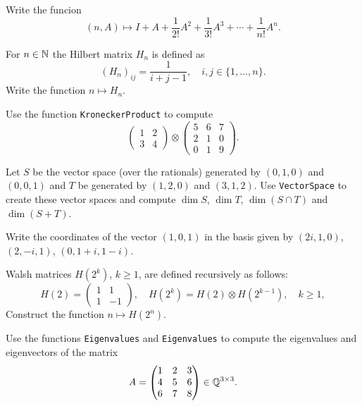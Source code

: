 \begin{prob}
    Write the funcion
    \[
    (n,A)\mapsto I+A+\frac{1}{2!}A^2+\frac{1}{3!}A^3+\cdots+\frac{1}{n!}A^{n}.
    \]
\end{prob}

\begin{prob}
  For $n\in\mathbb{N}$ the Hilbert matrix $H_n$ is defined as 
  \[
    (H_n)_{ij}=\frac{1}{i+j-1},\quad i,j\in\{1,\dots,n\}.
  \]
  Write the function $n\mapsto H_n$.
\end{prob}

\begin{prob}
  Use the function \lstinline{KroneckerProduct} to 
  compute
  \[
    \begin{pmatrix}
      1 & 2\\
      3 & 4
    \end{pmatrix}
    \otimes
    \begin{pmatrix}
      5 & 6 & 7\\
      2 & 1 & 0\\
      0 & 1 & 9
    \end{pmatrix}.
  \]
\end{prob}


\begin{prob}
	\label{prob:vsQ}
	Let $S$ be the vector space (over the rationals) generated by $(0,1,0)$ and
	$(0,0,1)$ and $T$ be generated by $(1,2,0)$ and $(3,1,2)$. Use
	\lstinline{VectorSpace} to create these vector spaces and compute $\dim S$,
	$\dim T$, $\dim(S\cap T)$ and $\dim(S+T)$.
\end{prob}

\begin{prob}
	\label{prob:withE(4)}
	Write the coordinates of the vector $(1,0,1)$ in the basis given by
	$(2i,1,0)$, $(2,-i,1)$, $(0,1+i,1-i)$. 
\end{prob}

\begin{prob}
  Walsh matrices $H(2^k)$, $k\geq1$, are defined recursively as follows:
  \[
    H(2)=\begin{pmatrix}
      1 & 1\\
      1 & -1
    \end{pmatrix}
    ,\quad
    H(2^k)=H(2)\otimes H(2^{k-1}),\quad k\geq1,
  \]
  Construct the function $n\mapsto
  H(2^n)$. 
\end{prob}

\begin{prob}
  \label{prob:eigenvalues}
  Use the functions \lstinline{Eigenvalues} and \lstinline{Eigenvalues} to
  compute the eigenvalues and eigenvectors of the matrix
  \[
    A=\begin{pmatrix}	
      1 & 2 & 3\\
      4 & 5 & 6\\
      6 & 7 & 8
    \end{pmatrix}\in\mathbb{Q}^{3\times3}.
  \]
\end{prob}

